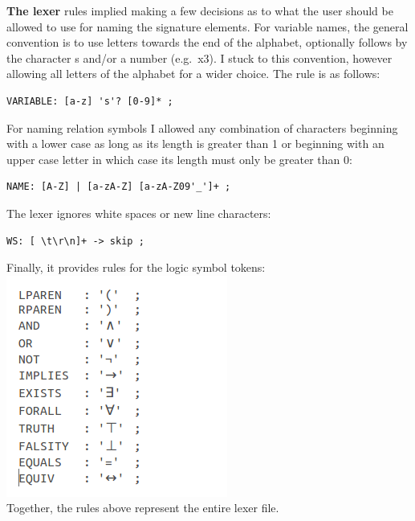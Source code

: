 \documentclass{report}
\begin{document}
\noindent \textbf{The lexer} rules implied making a few decisions as to what the user 
should be allowed to use for naming the signature elements. For variable names, 
the general convention is to use letters towards the end of the alphabet, 
optionally follows by the character s and/or a number (e.g.\ x3). I stuck to 
this convention, however allowing all letters of the alphabet for a wider 
choice. The rule is as follows:
\begin{verbatim}
VARIABLE: [a-z] 's'? [0-9]* ;
\end{verbatim}
For naming relation symbols I allowed any combination of characters beginning 
with a lower case as long as its length is greater than 1 or beginning with an 
upper case letter in which case its length must only be greater than 0:
\begin{verbatim}
NAME: [A-Z] | [a-zA-Z] [a-zA-Z09'_']+ ;
\end{verbatim}
The lexer ignores white spaces or new line characters:
\begin{verbatim}
WS: [ \t\r\n]+ -> skip ;
\end{verbatim}
Finally, it provides rules for the logic symbol tokens:\\
\includegraphics[scale=0.5]{tokens.png}\\
Together, the rules above represent the entire lexer file.
\end{document}
